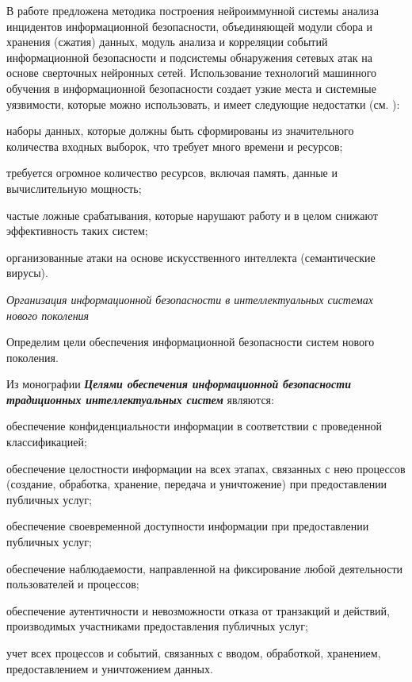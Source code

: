 В работе  предложена методика построения нейроиммунной системы анализа инцидентов информационной безопасности, объединяющей модули сбора и хранения (сжатия) данных, модуль анализа и корреляции событий информационной безопасности и подсистемы обнаружения сетевых атак на основе сверточных нейронных сетей. Использование технологий машинного обучения в информационной безопасности создает узкие места и системные уязвимости, которые можно использовать, и имеет следующие недостатки (см. ):

\begin{textitemize}
	\item наборы данных, которые должны быть сформированы из значительного количества входных выборок, что требует много времени и ресурсов;
	\item требуется огромное количество ресурсов, включая память, данные и вычислительную мощность;
	\item частые ложные срабатывания, которые нарушают работу и в целом снижают эффективность таких систем;
	\item организованные атаки на основе искусственного интеллекта (семантические вирусы).
\end{textitemize}

\textit{Организация информационной безопасности в интеллектуальных системах нового поколения}

Определим цели обеспечения информационной безопасности систем нового поколения.

Из монографии  \textbf{\textit{Целями обеспечения информационной безопасности традиционных интеллектуальных систем}} являются:

\begin{textitemize}
	\item обеспечение конфиденциальности информации в соответствии с проведенной классификацией;
	\item обеспечение целостности информации на всех этапах, связанных с нею процессов (создание, обработка, хранение, передача и уничтожение) при предоставлении публичных услуг;
	\item обеспечение своевременной доступности информации при предоставлении публичных услуг;
	\item обеспечение наблюдаемости, направленной на фиксирование любой деятельности пользователей и процессов;
	\item обеспечение аутентичности и невозможности отказа от транзакций и действий, производимых участниками предоставления публичных услуг;
	\item учет всех процессов и событий, связанных с вводом, обработкой, хранением, предоставлением и уничтожением данных.
\end{textitemize}


